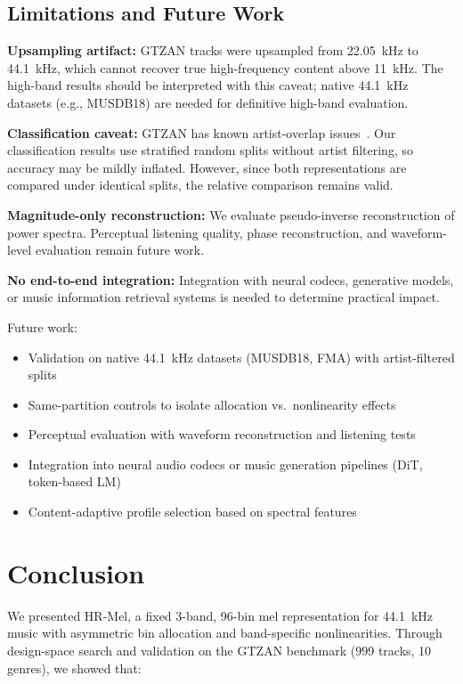 \documentclass[twocolumn]{article}
\begin{document}
\subsection{Limitations and Future Work}

\textbf{Upsampling artifact:} GTZAN tracks were upsampled from 22.05~kHz to 44.1~kHz, which cannot recover true high-frequency content above 11~kHz. The high-band results should be interpreted with this caveat; native 44.1~kHz datasets (e.g., MUSDB18) are needed for definitive high-band evaluation.

\textbf{Classification caveat:} GTZAN has known artist-overlap issues~\cite{sturm2013gtzan}. Our classification results use stratified random splits without artist filtering, so accuracy may be mildly inflated. However, since both representations are compared under identical splits, the relative comparison remains valid.

\textbf{Magnitude-only reconstruction:} We evaluate pseudo-inverse reconstruction of power spectra. Perceptual listening quality, phase reconstruction, and waveform-level evaluation remain future work.

\textbf{No end-to-end integration:} Integration with neural codecs, generative models, or music information retrieval systems is needed to determine practical impact.

Future work:
\begin{itemize}
\item Validation on native 44.1~kHz datasets (MUSDB18, FMA) with artist-filtered splits
\item Same-partition controls to isolate allocation vs.\ nonlinearity effects
\item Perceptual evaluation with waveform reconstruction and listening tests
\item Integration into neural audio codecs or music generation pipelines (DiT, token-based LM)
\item Content-adaptive profile selection based on spectral features
\end{itemize}

\section{Conclusion}

We presented HR-Mel, a fixed 3-band, 96-bin mel representation for 44.1~kHz music with asymmetric bin allocation and band-specific nonlinearities. Through design-space search and validation on the GTZAN benchmark (999 tracks, 10 genres), we showed that:
\end{document}
